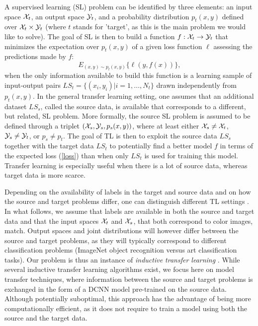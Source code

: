 \documentclass[runningheads]{llncs}
\begin{document}
A supervised learning (SL) problem can be identified by three elements: an input space ${\cal X}_t$, an output space ${\cal Y}_t$, and a probability distribution $p_t(x,y)$ defined over ${\cal X}_t\times {\cal Y}_t$ (where $t$ stands for 'target', as this is the main problem we would like to solve). The goal of SL is then to build a function $f:{\cal X}_t\rightarrow{\cal Y}_t$ that minimizes the expectation over $p_t(x,y)$ of a given loss function $\ell$ assessing the predictions made by $f$:
\begin{equation}\label{loss}
  E_{(x,y)\sim p_t(x,y)} \{\ell(y,f(x))\},
\end{equation}
when the only information available to build this function is a learning sample of input-output pairs $LS_t=\{(x_i,y_i)|i=1,\ldots,N_t\}$ drawn independently from $p_t(x,y)$. In the general transfer learning setting, one assumes that an additional dataset $LS_s$, called the source data, is available that corresponds to a different, but related, SL problem. More formally, the source SL problem is assumed to be defined through a triplet $({\cal X}_s,{\cal Y}_s,p_s(x,y))$, where at least either ${\cal X}_s\neq {\cal X}_t$, ${\cal Y}_s\neq {\cal Y}_t$, or $p_s\neq p_t$. The goal of TL is then to exploit the source data $LS_s$ together with the target data $LS_t$ to potentially find a better model $f$ in terms of the expected loss (\ref{loss}) than when only $LS_t$ is used for training this model. Transfer learning is especially useful when there is a lot of source data, whereas target data is more scarce.

Depending on the availability of labels in the target and source data and on how the source and target problems differ, one can distinguish different TL settings \cite{pan2010survey}. In what follows, we assume that labels are available in both the source and target data and that the input spaces ${\cal X}_t$ and ${\cal X}_s$, that both correspond to color images, match. Output spaces and joint distributions will however differ between the source and target problems, as they will typically correspond to different classification problems (ImageNet object recognition versus art classification tasks). Our problem is thus an instance of {\it inductive transfer learning} \cite{pan2010survey}. While several inductive transfer learning algorithms exist, we focus here on model transfer techniques, where information between the source and target problems is exchanged in the form of a DCNN model pre-trained on the source data. Although potentially suboptimal, this approach has the advantage of being more computationally efficient, as it does not require to train a model using both the source and the target data.
\end{document}
